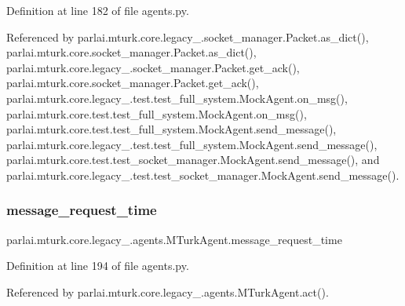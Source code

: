Definition at line 182 of file agents.\+py.



Referenced by parlai.\+mturk.\+core.\+legacy\+\_.\+socket\+\_\+manager.\+Packet.\+as\+\_\+dict(), parlai.\+mturk.\+core.\+socket\+\_\+manager.\+Packet.\+as\+\_\+dict(), parlai.\+mturk.\+core.\+legacy\+\_.\+socket\+\_\+manager.\+Packet.\+get\+\_\+ack(), parlai.\+mturk.\+core.\+socket\+\_\+manager.\+Packet.\+get\+\_\+ack(), parlai.\+mturk.\+core.\+legacy\+\_.\+test.\+test\+\_\+full\+\_\+system.\+Mock\+Agent.\+on\+\_\+msg(), parlai.\+mturk.\+core.\+test.\+test\+\_\+full\+\_\+system.\+Mock\+Agent.\+on\+\_\+msg(), parlai.\+mturk.\+core.\+test.\+test\+\_\+full\+\_\+system.\+Mock\+Agent.\+send\+\_\+message(), parlai.\+mturk.\+core.\+legacy\+\_.\+test.\+test\+\_\+full\+\_\+system.\+Mock\+Agent.\+send\+\_\+message(), parlai.\+mturk.\+core.\+test.\+test\+\_\+socket\+\_\+manager.\+Mock\+Agent.\+send\+\_\+message(), and parlai.\+mturk.\+core.\+legacy\+\_.\+test.\+test\+\_\+socket\+\_\+manager.\+Mock\+Agent.\+send\+\_\+message().

\mbox{\label{classparlai_1_1mturk_1_1core_1_1legacy__2018_1_1agents_1_1MTurkAgent_a52155384e8a0df44023f1fcdf7158848}} 
\subsubsection{\texorpdfstring{message\+\_\+request\+\_\+time}{message\_request\_time}}
{\footnotesize\ttfamily parlai.\+mturk.\+core.\+legacy\+\_.\+agents.\+M\+Turk\+Agent.\+message\+\_\+request\+\_\+time}



Definition at line 194 of file agents.\+py.



Referenced by parlai.\+mturk.\+core.\+legacy\+\_.\+agents.\+M\+Turk\+Agent.\+act().

\mbox{\label{classparlai_1_1mturk_1_1core_1_1legacy__2018_1_1agents_1_1MTurkAgent_aeaa9706f70064eb85dfef711c1e0682d}} 
